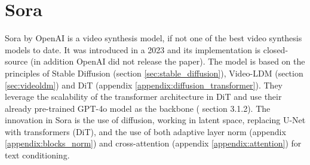 \section{Sora}

Sora by OpenAI is a video synthesis model, if not one of the best video synthesis models to date. It was introduced in a 2023 and its implementation is closed-source (in addition OpenAI did not release the paper). The model is based on the principles of Stable Diffusion (section \ref{sec:stable_diffusion}), Video-LDM (section \ref{sec:videoldm}) and DiT (appendix \ref{appendix:diffusion_transformer}). They leverage the scalability of the transformer architecture in DiT and use their already pre-trained GPT-4o model as the backbone (\cite{sun2024sora} section 3.1.2). The innovation in Sora is the use of diffusion, working in latent space, replacing U-Net with transformers (DiT), and the use of both adaptive layer norm (appendix \ref{appendix:blocks_norm}) and cross-attention (appendix \ref{appendix:attention}) for text conditioning.

